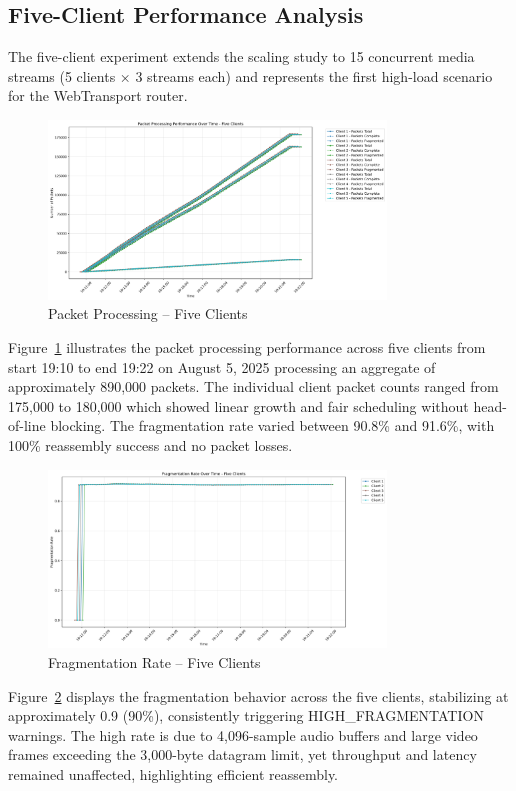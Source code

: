 \subsection{Five-Client Performance Analysis}
The five-client experiment extends the scaling study to 15 concurrent media streams (5 clients × 3 streams each) and represents the first high-load scenario for the WebTransport router.
\begin{figure}[h!]
\centering
\includegraphics[width=0.8\textwidth]{Evaluation/packet_processing_by_client_five-clients.png}
\caption{Packet Processing – Five Clients}
\label{fig:packet-processing-five-clients}
\end{figure}
Figure~\ref{fig:packet-processing-five-clients} illustrates the packet processing performance across five clients from start 19:10 to end 19:22 on August 5, 2025 processing an aggregate of approximately 890,000 packets. The individual client packet counts ranged from 175,000 to 180,000 which showed linear growth and fair scheduling without head-of-line blocking. The fragmentation rate varied between 90.8\% and 91.6\%, with 100\% reassembly success and no packet losses.
\begin{figure}[h!]
\centering
\includegraphics[width=0.8\textwidth]{Evaluation/fragmentation_by_client_five-clients.png}
\caption{Fragmentation Rate – Five Clients}
\label{fig:fragmentation-five-clients}
\end{figure}
Figure~\ref{fig:fragmentation-five-clients} displays the fragmentation behavior across the five clients, stabilizing at approximately 0.9 (90\%), consistently triggering HIGH\_FRAGMENTATION warnings. The high rate is due to 4,096-sample audio buffers and large video frames exceeding the 3,000-byte datagram limit, yet throughput and latency remained unaffected, highlighting efficient reassembly.
